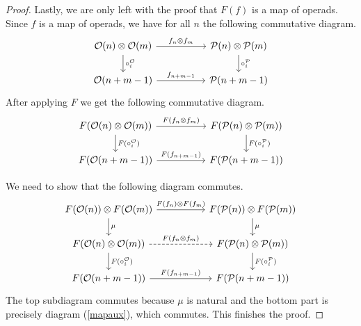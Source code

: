\documentclass[Thesis.tex]{subfiles}
\begin{document}
\begin{proof}
   Lastly, we are only left with the proof that $F(f)$ is a map of operads. Since $f$ is a map of operads, we have for all $n$ the following commutative diagram.
   \[
\begin{tikzcd}[column sep = 5em]
\OO(n)\otimes \OO(m)\arrow[r, "f_n\otimes f_m"]\arrow[d, "\circ_i^\OO"] & \PP(n)\otimes\PP(m)\arrow[d, "\circ_i^\PP"]\\
\OO(n+m-1)\arrow[r, "f_{n+m-1}"] & \PP(n+m-1)
\end{tikzcd}   
   \]
   After applying $F$ we get the following commutative diagram.
   \begin{equation}\label{mapaux}
   \begin{tikzcd}[column sep = 5em]
F(\OO(n)\otimes \OO(m))\arrow[r, "F(f_n\otimes f_m)"]\arrow[d, "F(\circ_i^\OO)"] & F(\PP(n)\otimes\PP(m))\arrow[d, "F(\circ_i^\PP)"]\\
F(\OO(n+m-1))\arrow[r, "F(f_{n+m-1})"] & F(\PP(n+m-1))
\end{tikzcd} 
   \end{equation}
   
   We need to show that the following diagram commutes.
   \[
   \begin{tikzcd}[column sep = 5em]
F(\OO(n))\otimes F(\OO(m))\arrow[r, "F(f_n)\otimes F(f_m)"]\arrow[d,"\mu"] & F(\PP(n))\otimes F(\PP(m))\arrow[d, "\mu"]\\
F(\OO(n)\otimes \OO(m))\arrow[r, dashed, "F(f_n\otimes f_m)"]\arrow[d, "F(\circ_i^\OO)"] & F(\PP(n)\otimes\PP(m))\arrow[d, "F(\circ_i^\PP)"]\\
F(\OO(n+m-1))\arrow[r, "F(f_{n+m-1})"] & F(\PP(n+m-1))
\end{tikzcd}    
   \]
   The top subdiagram commutes because $\mu$ is natural and the bottom part is precisely diagram  (\ref{mapaux}), which commutes. This finishes the proof.
\end{proof}
\end{document}
